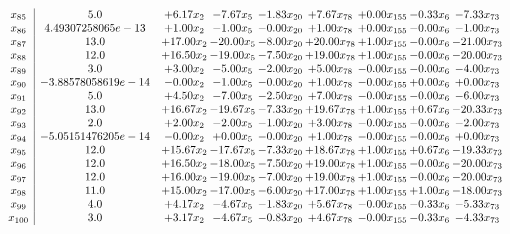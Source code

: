 \documentclass[8pt]{article}
\begin{document}
\[\begin{array}{c| c c@{\hskip 2pt} c@{\hskip 2pt} c@{\hskip 2pt} c@{\hskip 2pt} c@{\hskip 2pt} c@{\hskip 2pt} c@{\hskip 2pt} }
 x_{85}   &  5.0 & +  6.17 x_{2} & -7.67 x_{5} & -1.83 x_{20} & +  7.67 x_{78} & +  0.00 x_{155} & -0.33 x_{6} & -7.33 x_{73}\\
 x_{86}   &  4.49307258065e-13 & +  1.00 x_{2} & -1.00 x_{5} & -0.00 x_{20} & +  1.00 x_{78} & +  0.00 x_{155} & -0.00 x_{6} & -1.00 x_{73}\\
 x_{87}   &  13.0 & + 17.00 x_{2} & -20.00 x_{5} & -8.00 x_{20} & + 20.00 x_{78} & +  1.00 x_{155} & -0.00 x_{6} & -21.00 x_{73}\\
 x_{88}   &  12.0 & + 16.50 x_{2} & -19.00 x_{5} & -7.50 x_{20} & + 19.00 x_{78} & +  1.00 x_{155} & -0.00 x_{6} & -20.00 x_{73}\\
 x_{89}   &  3.0 & +  3.00 x_{2} & -5.00 x_{5} & -2.00 x_{20} & +  5.00 x_{78} & -0.00 x_{155} & -0.00 x_{6} & -4.00 x_{73}\\
 x_{90}   &  -3.88578058619e-14 & -0.00 x_{2} & -1.00 x_{5} & -0.00 x_{20} & +  1.00 x_{78} & -0.00 x_{155} & +  0.00 x_{6} & +  0.00 x_{73}\\
 x_{91}   &  5.0 & +  4.50 x_{2} & -7.00 x_{5} & -2.50 x_{20} & +  7.00 x_{78} & -0.00 x_{155} & -0.00 x_{6} & -6.00 x_{73}\\
 x_{92}   &  13.0 & + 16.67 x_{2} & -19.67 x_{5} & -7.33 x_{20} & + 19.67 x_{78} & +  1.00 x_{155} & +  0.67 x_{6} & -20.33 x_{73}\\
 x_{93}   &  2.0 & +  2.00 x_{2} & -2.00 x_{5} & -1.00 x_{20} & +  3.00 x_{78} & -0.00 x_{155} & -0.00 x_{6} & -2.00 x_{73}\\
 x_{94}   &  -5.05151476205e-14 & -0.00 x_{2} & +  0.00 x_{5} & -0.00 x_{20} & +  1.00 x_{78} & -0.00 x_{155} & -0.00 x_{6} & +  0.00 x_{73}\\
 x_{95}   &  12.0 & + 15.67 x_{2} & -17.67 x_{5} & -7.33 x_{20} & + 18.67 x_{78} & +  1.00 x_{155} & +  0.67 x_{6} & -19.33 x_{73}\\
 x_{96}   &  12.0 & + 16.50 x_{2} & -18.00 x_{5} & -7.50 x_{20} & + 19.00 x_{78} & +  1.00 x_{155} & -0.00 x_{6} & -20.00 x_{73}\\
 x_{97}   &  12.0 & + 16.00 x_{2} & -19.00 x_{5} & -7.00 x_{20} & + 19.00 x_{78} & +  1.00 x_{155} & -0.00 x_{6} & -20.00 x_{73}\\
 x_{98}   &  11.0 & + 15.00 x_{2} & -17.00 x_{5} & -6.00 x_{20} & + 17.00 x_{78} & +  1.00 x_{155} & +  1.00 x_{6} & -18.00 x_{73}\\
 x_{99}   &  4.0 & +  4.17 x_{2} & -4.67 x_{5} & -1.83 x_{20} & +  5.67 x_{78} & -0.00 x_{155} & -0.33 x_{6} & -5.33 x_{73}\\
 x_{100}   &  3.0 & +  3.17 x_{2} & -4.67 x_{5} & -0.83 x_{20} & +  4.67 x_{78} & -0.00 x_{155} & -0.33 x_{6} & -4.33 x_{73}\\

\end{array}\]
\end{document}
